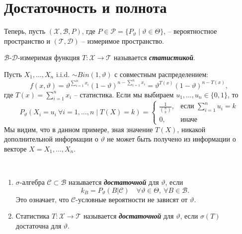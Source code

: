 \chapter{Достаточность и полнота}

Теперь, пусть $(\mathcal{X}, \mathcal{B}, P)$, где $P \in \mathcal{P} = \{P_\vartheta \mid \vartheta \in \Theta \} $, -- вероятностное пространство и $(\mathcal{T}, \mathcal{D})$ -- измеримое пространство.

\begin{defn}
	$\mathcal{B}$-$\mathcal{D}$-измеримая функция $T:\mathcal{X} \rightarrow \mathcal{T}$ называется \textbf{\textit{статистикой}}.
\end{defn}

\begin{exmp} \label{exmp4.2}
	Пусть $X_1, \dots, X_n$ i.i.d. $\sim Bin(1, \vartheta)$ с совместным распределением:
	\[ f(x, \vartheta) = \vartheta^{\sum_{i=1}^{n}x_i}(1-\vartheta)^{n-\sum_{i=1}^{n}x_i}=\vartheta^{T(x)}(1-\vartheta)^{n-T(x)}, \]
	где $T(x)=\sum_{i=1}^{n}x_i$ -- статистика.
	Если мы выбираем $u_1, \dots, u_n \in \{0,1\}$, то
	\[
		P_\vartheta(X_i=u_i \  \forall i = 1, \dots, n \mid T(X)=k)=\left \{
		\begin{array}{cl}
		\frac{1}{\binom{n}{k}}, & \text{если } \sum_{i=1}^{n}u_i=k \\
		0, & \text{иначе}
		\end{array}
		\right.
	\]
	Мы видим, что в данном примере, зная значение $T(X)$, никакой дополнительной информации о $\vartheta$ не может быть получено из информации о векторе $X=X_1, \dots, X_n$.
\end{exmp}

\begin{defn} \
	\begin{enumerate}
		\item $\sigma$-алгебра $\mathcal{C} \subset \mathcal{B}$ называется \textbf{\textit{достаточной}} для $\vartheta$, если
		\[ k_B=P_\vartheta(B | \mathcal{C}) \quad \forall \vartheta \in \Theta,\ \forall B \in \mathcal{B}. \]
		Это означает, что $\mathcal{C}$-условные вероятности не зависят от $\vartheta$.
		\item Статистика $T\colon\mathcal{X} \rightarrow \mathcal{T}$ называется \textbf{\textit{достаточной}} для $\vartheta$, если $\sigma(T)$ достаточна для $\vartheta$.
	\end{enumerate}
\end{defn}

